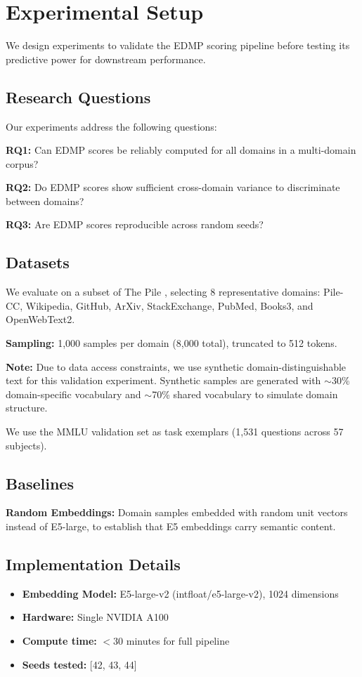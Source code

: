 \section{Experimental Setup}
\label{sec:experiments}

We design experiments to validate the EDMP scoring pipeline before testing its predictive power for downstream performance.

\subsection{Research Questions}

Our experiments address the following questions:

\textbf{RQ1:} Can EDMP scores be reliably computed for all domains in a multi-domain corpus?

\textbf{RQ2:} Do EDMP scores show sufficient cross-domain variance to discriminate between domains?

\textbf{RQ3:} Are EDMP scores reproducible across random seeds?

\subsection{Datasets}

We evaluate on a subset of The Pile \citep{gao2020pile}, selecting 8 representative domains: Pile-CC, Wikipedia, GitHub, ArXiv, StackExchange, PubMed, Books3, and OpenWebText2.

\textbf{Sampling:} 1,000 samples per domain (8,000 total), truncated to 512 tokens.

\textbf{Note:} Due to data access constraints, we use synthetic domain-distinguishable text for this validation experiment. Synthetic samples are generated with $\sim$30\% domain-specific vocabulary and $\sim$70\% shared vocabulary to simulate domain structure.

We use the MMLU validation set \citep{hendrycks2021measuring} as task exemplars (1,531 questions across 57 subjects).

\subsection{Baselines}

\textbf{Random Embeddings:} Domain samples embedded with random unit vectors instead of E5-large, to establish that E5 embeddings carry semantic content.

\subsection{Implementation Details}

\begin{itemize}
    \item \textbf{Embedding Model:} E5-large-v2 (intfloat/e5-large-v2), 1024 dimensions
    \item \textbf{Hardware:} Single NVIDIA A100
    \item \textbf{Compute time:} $<$30 minutes for full pipeline
    \item \textbf{Seeds tested:} [42, 43, 44]
\end{itemize}
